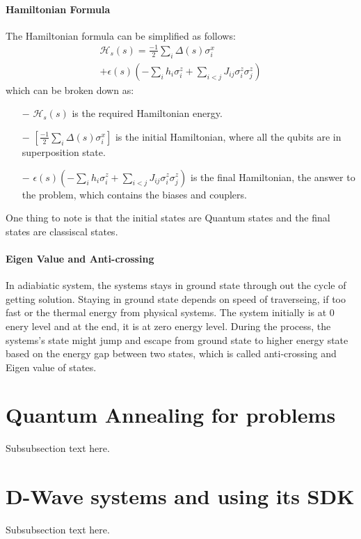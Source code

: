 \documentclass[12pt,conference]{IEEEtran}
\begin{document}
\paragraph{Hamiltonian Formula} 
The Hamiltonian formula can be simplified as follows:
\begin{multline*}
  \mathcal{H}_s(s) = \frac{-1}{2} \sum_i \Delta (s) \sigma_i^x  \\ + \epsilon(s) ( - \sum_i h_i \sigma_i^z + \sum_{i<j} J_{ij}  \sigma_i^z \sigma_j^z)
\end{multline*}
which can be broken down as:
\begin{itemize}
  \item[$-$] $\mathcal{H}_s(s)$ is the required Hamiltonian energy.
  \item[$-$] $[\frac{-1}{2} \sum_i \Delta (s) \sigma_i^x]$ is the initial Hamiltonian, where all the qubits are in superposition state.
  \item[$-$] $ \epsilon(s) ( - \sum_i h_i \sigma_i^z + \sum_{i<j} J_{ij}  \sigma_i^z \sigma_j^z)$ is the final Hamiltonian, the answer to the problem, which contains the biases and couplers.
\end{itemize} 
One thing to note is that the initial states are Quantum states and the final states are classiscal states.

\paragraph{Eigen Value and Anti-crossing}
In adiabiatic system, the systems stays in ground state through out the cycle of getting solution. Staying in ground state depends on speed of traverseing, if too fast or the thermal energy from physical systems. The system initially is at 0 enery level and at the end, it is at zero energy level. During the process, the systems's state might jump and escape from ground state to higher energy state based on the energy gap between two states, which is called anti-crossing and Eigen value of states.

\section{Quantum Annealing for problems}
Subsubsection text here.

\section{D-Wave systems and using its SDK}
Subsubsection text here.
\end{document}
